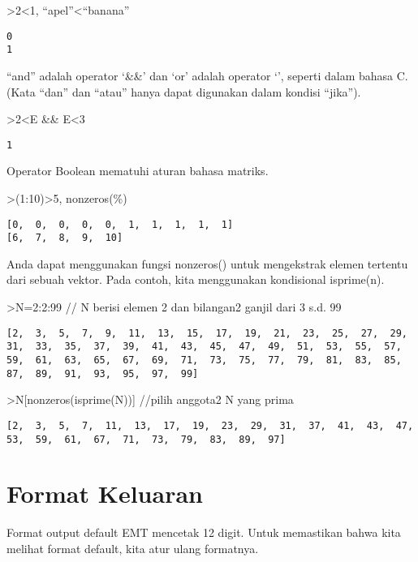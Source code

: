 \documentclass[
]{book}
\begin{document}
\textgreater2\textless1, ``apel''\textless{}``banana''

\begin{verbatim}
0
1
\end{verbatim}

``and'' adalah operator `\&\&' dan `or' adalah operator `\textbar\textbar{}', seperti dalam bahasa C. (Kata ``dan'' dan ``atau'' hanya dapat digunakan dalam kondisi ``jika'').

\textgreater2\textless E \&\& E\textless3

\begin{verbatim}
1
\end{verbatim}

Operator Boolean mematuhi aturan bahasa matriks.

\textgreater(1:10)\textgreater5, nonzeros(\%)

\begin{verbatim}
[0,  0,  0,  0,  0,  1,  1,  1,  1,  1]
[6,  7,  8,  9,  10]
\end{verbatim}

Anda dapat menggunakan fungsi nonzeros() untuk mengekstrak elemen tertentu dari sebuah vektor. Pada contoh, kita menggunakan kondisional isprime(n).

\textgreater N=2:2:99 // N berisi elemen 2 dan bilangan2 ganjil dari 3 s.d. 99

\begin{verbatim}
[2,  3,  5,  7,  9,  11,  13,  15,  17,  19,  21,  23,  25,  27,  29,
31,  33,  35,  37,  39,  41,  43,  45,  47,  49,  51,  53,  55,  57,
59,  61,  63,  65,  67,  69,  71,  73,  75,  77,  79,  81,  83,  85,
87,  89,  91,  93,  95,  97,  99]
\end{verbatim}

\textgreater N{[}nonzeros(isprime(N)){]} //pilih anggota2 N yang prima

\begin{verbatim}
[2,  3,  5,  7,  11,  13,  17,  19,  23,  29,  31,  37,  41,  43,  47,
53,  59,  61,  67,  71,  73,  79,  83,  89,  97]
\end{verbatim}

\section{Format Keluaran}\label{format-keluaran}

Format output default EMT mencetak 12 digit. Untuk memastikan bahwa kita melihat format default, kita atur ulang formatnya.
\end{document}
